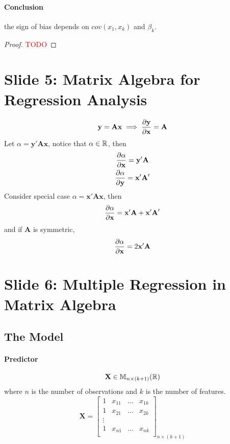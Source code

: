 \documentclass[]{article}
\begin{document}
    \paragraph{Conclusion} the sign of bias depends on $cov(x_1, x_k)$ and $\beta_k$.
    
    \begin{proof}
    	\textcolor{red}{TODO}
    \end{proof}
    
    \section{Slide 5: Matrix Algebra for Regression Analysis}
    	\begin{equation}
    		\textbf{y} = \textbf{A} \textbf{x} \implies \frac{\partial{\textbf{y}}}{\partial{\textbf{x}}} = \textbf{A}
    	\end{equation}
    	Let $\alpha = \textbf{y}' \textbf{A} \textbf{x}$, notice that $\alpha \in \mathbb{R}$, then 
    	\begin{gather}
    		\frac{\partial{\alpha}}{\partial{\textbf{x}}} = \textbf{y}' \textbf{A} \\
    		\frac{\partial{	\alpha}}{\partial{\textbf{y}}} = \textbf{x}' \textbf{A}'
    	\end{gather}
    	Consider special case $\alpha = \textbf{x}' \textbf{A} \textbf{x}$, then 
    	\begin{equation}
    		\frac{\partial{\alpha}}{\partial{\textbf{x}}} = \textbf{x}' \textbf{A} + \textbf{x}' \textbf{A}'
    	\end{equation}
    	and if $\textbf{A}$ is symmetric, 
    	\begin{equation}
    		\frac{\partial{\alpha}}{\partial{\textbf{x}}} = 2 \textbf{x}' \textbf{A}
    	\end{equation}
    
    \section{Slide 6: Multiple Regression in Matrix Algebra}
    	\subsection{The Model}
    		\paragraph{Predictor}
    			\[
    				\textbf{X} \in \mathbb{M}_{n \times (k+1)}(\mathbb{R})
    			\]
    			where $n$ is the number of observations and $k$ is the number of features.
    			\[
    				\textbf{X} = \begin{bmatrix}
    					1 & x_{11} & \dots & x_{1k} \\
    					1 & x_{21} & \dots & x_{2k} \\
    					\vdots \\
    					1 & x_{n1} & \dots & x_{nk} \\
    				\end{bmatrix}_{n \times (k+1)}
    			\]
\end{document}
